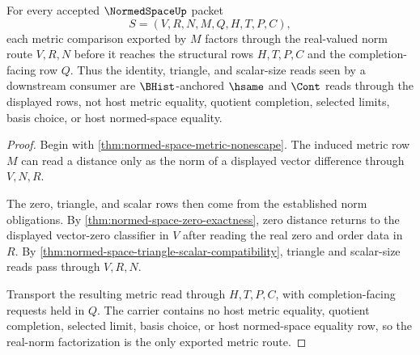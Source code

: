 \begin{theorem}
\label{thm:normed-space-real-norm-metric-factorization}
For every accepted $\NormedSpaceUp$ packet
$$
S=(V,R,N,M,Q,H,T,P,C),
$$
each metric comparison exported by $M$ factors through the real-valued norm route $V,R,N$ before it reaches the structural rows $H,T,P,C$ and the completion-facing row $Q$. Thus the identity, triangle, and scalar-size reads seen by a downstream consumer are $\BHist$-anchored $\hsame$ and $\Cont$ reads through the displayed rows, not host metric equality, quotient completion, selected limits, basis choice, or host normed-space equality.
\end{theorem}
\begin{proof}
Begin with \autoref{thm:normed-space-metric-nonescape}. The induced metric row $M$ can read a distance only as the norm of a displayed vector difference through $V,N,R$.

The zero, triangle, and scalar rows then come from the established norm obligations. By \autoref{thm:normed-space-zero-exactness}, zero distance returns to the displayed vector-zero classifier in $V$ after reading the real zero and order data in $R$. By \autoref{thm:normed-space-triangle-scalar-compatibility}, triangle and scalar-size reads pass through $V,R,N$.

Transport the resulting metric read through $H,T,P,C$, with completion-facing requests held in $Q$. The carrier contains no host metric equality, quotient completion, selected limit, basis choice, or host normed-space equality row, so the real-norm factorization is the only exported metric route.
\end{proof}

